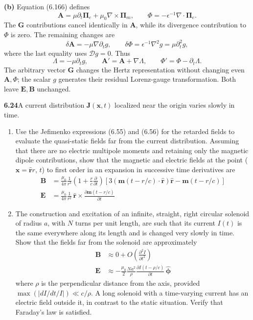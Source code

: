\textbf{(b)} Equation (6.166) defines
\[
\mathbf A=\mu\partial_t\boldsymbol\Pi_e+\mu_0\nabla\times\boldsymbol\Pi_m,
\qquad \Phi=-\epsilon^{-1}\nabla\cdot\boldsymbol\Pi_e.
\]
The $\mathbf G$ contributions cancel identically in $\mathbf A$, while
its divergence contribution to $\Phi$ is zero. The remaining changes are
\[
\delta\mathbf A=-\mu\nabla\partial_tg,\qquad
\delta\Phi=\epsilon^{-1}\nabla^2g=\mu\partial_t^2g,
\]
where the last equality uses $\mathcal Dg=0$. Thus
\[
\boxed{\Lambda=-\mu\partial_tg,\qquad
\mathbf A'=\mathbf A+\nabla\Lambda,\qquad
\Phi'=\Phi-\partial_t\Lambda.}
\]
The arbitrary vector $\mathbf G$ changes the Hertz representation without
changing even $\mathbf A,\Phi$; the scalar $g$ generates their residual
Lorenz-gauge transformation. Both leave $\mathbf E,\mathbf B$ unchanged.

\par\bigskip
\noindent\textbf{6.24}\quad A current distribution $\mathbf{J}(\mathbf{x},t)$ localized near the origin varies slowly in time.
\begin{enumerate}
\item[(a)] Use the Jefimenko expressions (6.55) and (6.56) for the retarded fields to evaluate the quasi-static fields far from the current distribution. Assuming that there are no electric multipole moments and retaining only the magnetic dipole contributions, show that the magnetic and electric fields at the point ($\mathbf{x}=\hat{\mathbf{r}}r$, $t$) to first order in an expansion in successive time derivatives are
\begin{align*}
\mathbf{B}&=\frac{\mu_{0}}{4\pi}\frac{1}{r^{3}}\left(1+\frac{r}{c}\frac{\partial}{\partial t}\right)\![3(\mathbf{m}(t-r/c)\cdot\hat{\mathbf{r}})\hat{\mathbf{r}}-\mathbf{m}(t-r/c)]\\[4pt]
\mathbf{E}&=\frac{\mu_{0}}{4\pi}\frac{1}{r^{2}}\,\hat{\mathbf{r}}\times\frac{\partial\mathbf{m}(t-r/c)}{\partial t}
\end{align*}
\item[(b)] The construction and excitation of an infinite, straight, right circular solenoid of radius $a$, with $N$ turns per unit length, are such that its current $I(t)$ is the same everywhere along its length and is changed very slowly in time. Show that the fields far from the solenoid are approximately
\begin{align*}
\mathbf{B}&\approx 0+O\!\left(\frac{\partial^{2}I}{\partial t^{2}}\right)\\[4pt]
\mathbf{E}&\approx-\frac{\mu_{0}}{2}\frac{Na^{2}}{\rho}\frac{\partial I(t-\rho/c)}{\partial t}\,\hat{\boldsymbol{\phi}}
\end{align*}
where $\rho$ is the perpendicular distance from the axis, provided $\max(|dI/dt/I|)\ll c/\rho$.  A long solenoid with a time-varying current has an electric field outside it, in contrast to the static situation. Verify that Faraday's law is satisfied.
\end{enumerate}
\solution

